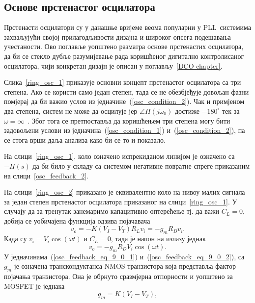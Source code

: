 \documentclass[master]{finthesis}
\def \PLL  {PLL} %
\begin{document}
\subsection{Основе прстенастог осцилатора} \label{section:osc:ring_osc}
Прстенасти осцилатори су у данашње вријеме веома популарни у \PLL\ системима захваљујући својој прилагодљивости дизајна и широког опсега подешавања учестаности. Ово поглавље уопштено разматра основе прстенастих осцилатора, да би се стекло дубље разумијевање рада коришћеног дигитално контролисаног осцилатора, чији конкретан дизајн је описан у поглављу~\ref{DCO chapter}. \par
Слика~\ref{ring_osc_1} приказује основни концепт прстенастог осцилатора са три степена. Ако се користи само један степен, тада се не обезбјеђује довољан фазни помјерај да би важио услов из једначине~(\ref{osc_condition_2}). Чак и примјеном два степена, систем не може да осцилује јер $\angle H(j\omega_{0})$ достиже $-180^{\circ}$ тек за $\omega=\infty$~\cite{Razavi:PLL_CMOS_2020}. Због тога се претпоставља да коришћењем три степена могу бити задовољени услови из једначина~(\ref{osc_condition_1}) и~(\ref{osc_condition_2}), па се стога врши даља анализа како би се то и показало. \par 
На слици~\ref{ring_osc_1}, коло означено испрекиданом линијом је означено са $-H(s)$ да би било у складу са системом негативне повратне спреге приказаним на слици~\ref{osc_feedback_2}. \par


На слици~\ref{ring_osc_2} приказано је еквивалентно коло на нивоу малих сигнала за један степен прстенастог осцилатора приказаног на слици~\ref{ring_osc_1}. У случају да за тренутак занемаримо капацитивно оптерећење тј. да важи $C_{L}=0$, добија се уобичајена функција одзива појачавача
\begin{equation} 
	\label{osc_feedback_eq_9_0_1}
	v_{o} = -K(V_{I} - V_{T})R_{L}v_{i} = -g_{m}R_{D}v_{i}.
\end{equation}
Када су $v_{i}=V_{i}\cos (\omega t)$ и $C_{L}=0$, тада је напон на излазу једнак
\begin{equation} 
	\label{osc_feedback_eq_9_0_2}
	v_{o} = -g_{m}R_{D}V_{i}\cos (\omega t).
\end{equation}
У једначинама~(\ref{osc_feedback_eq_9_0_1}) и~(\ref{osc_feedback_eq_9_0_2}), са $g_{m}$ је означена транскондуктанса NMOS транзистора која представља фактор појачања транзистора. Она је обрнуто сразмјерна отпорности и уопштено за MOSFET је једнака
\begin{equation} 
	\label{osc_feedback_eq_9_1}
	g_{m} = K(V_{I} - V_{T}),
\end{equation}
\end{document}
